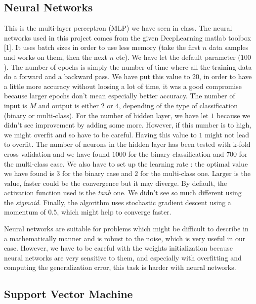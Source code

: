 \documentclass{article} %
\begin{document}
\subsection{Neural Networks}

This is the multi-layer perceptron (MLP) we have seen in class. The neural networks used in this project comes from the given DeepLearning matlab toolbox [1]. It uses batch sizes in order to use less memory (take the first $n$ data samples and works on them, then the next $n$ etc). We have let the default parameter ($100$). The number of epochs is simply the number of time where all the training data do a forward and a backward pass. We have put this value to $20$, in order to have a little more accuracy without loosing a lot of time, it was a good compromise because larger epochs don't mean especially better accuracy. The number of input is $M$ and output is either $2$ or $4$, depending of the type of classification (binary or multi-class). For the number of hidden layer, we have let $1$ because we didn't see improvement by adding some more. However, if this number is to high, we might overfit and so have to be careful. Having this value to $1$ might not lead to overfit. The number of neurons in the hidden layer has been tested with k-fold cross validation and we have found $1000$ for the binary classification and $700$ for the multi-class case. We also have to set up the learning rate : the optimal value we have found is $3$ for the binary case and $2$ for the multi-class one. Larger is the value, faster could be the convergence but it may diverge. By default, the activation function used is the \textit{tanh} one. We didn't see so much different using the \textit{sigmoid}. Finally, the algorithm uses stochastic gradient descent using a momentum of $0.5$, which might help to converge faster.

Neural networks are suitable for problems which might be difficult to describe in a mathematically manner and is robust to the noise, which is very useful in our case. However, we have to be careful with the weights initialization because neural networks are very sensitive to them, and especially with overfitting and computing the generalization error, this task is harder with neural networks.

\subsection{Support Vector Machine}
\end{document}
